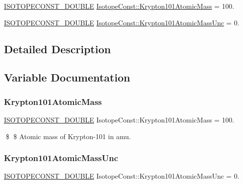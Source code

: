\begin{DoxyCompactItemize}
\item 
\mbox{\hyperlink{group___isotope_const-_macros_ga8f45a7272ce02c0b4c65c44636ed719a}{I\+S\+O\+T\+O\+P\+E\+C\+O\+N\+S\+T\+\_\+\+D\+O\+U\+B\+LE}} \mbox{\hyperlink{group___isotope_const-_krypton-_kr101_ga9460b007e208ea9e90c5a6b66d0fc6b2}{Isotope\+Const\+::\+Krypton101\+Atomic\+Mass}} = 100.
\item 
\mbox{\hyperlink{group___isotope_const-_macros_ga8f45a7272ce02c0b4c65c44636ed719a}{I\+S\+O\+T\+O\+P\+E\+C\+O\+N\+S\+T\+\_\+\+D\+O\+U\+B\+LE}} \mbox{\hyperlink{group___isotope_const-_krypton-_kr101_gab1969d5836ad8a92a9a0f6746f9741e0}{Isotope\+Const\+::\+Krypton101\+Atomic\+Mass\+Unc}} = 0.
\end{DoxyCompactItemize}


\subsection{Detailed Description}


\subsection{Variable Documentation}
\mbox{\label{group___isotope_const-_krypton-_kr101_ga9460b007e208ea9e90c5a6b66d0fc6b2}} 
\subsubsection{\texorpdfstring{Krypton101\+Atomic\+Mass}{Krypton101AtomicMass}}
{\footnotesize\ttfamily \mbox{\hyperlink{group___isotope_const-_macros_ga8f45a7272ce02c0b4c65c44636ed719a}{I\+S\+O\+T\+O\+P\+E\+C\+O\+N\+S\+T\+\_\+\+D\+O\+U\+B\+LE}} Isotope\+Const\+::\+Krypton101\+Atomic\+Mass = 100.}

\$ \$ Atomic mass of Krypton-\/101 in amu. \mbox{\label{group___isotope_const-_krypton-_kr101_gab1969d5836ad8a92a9a0f6746f9741e0}} 
\subsubsection{\texorpdfstring{Krypton101\+Atomic\+Mass\+Unc}{Krypton101AtomicMassUnc}}
{\footnotesize\ttfamily \mbox{\hyperlink{group___isotope_const-_macros_ga8f45a7272ce02c0b4c65c44636ed719a}{I\+S\+O\+T\+O\+P\+E\+C\+O\+N\+S\+T\+\_\+\+D\+O\+U\+B\+LE}} Isotope\+Const\+::\+Krypton101\+Atomic\+Mass\+Unc = 0.}

